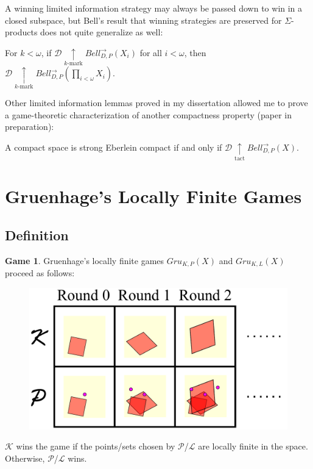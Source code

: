 \documentclass{beamer}
\theoremstyle{definition}
\newtheorem{game}[theorem]{Game}
\newcommand{\tactwin}{\underset{\text{tact}}{\uparrow}}
\newcommand{\kmarkwin}[1]{\underset{#1\text{-mark}}{\uparrow}}
\newcommand{\gruKPGame}[1]{Gru_{K,P}\left({#1}\right)}
\newcommand{\gruKLGame}[1]{Gru_{K,L}\left({#1}\right)}
\newcommand{\bellAbsConGame}[1]{Bell_{D,P}^{\to}\left({#1}\right)}
\newcommand{\<}{\langle}
\renewcommand{\>}{\rangle}
\newcommand{\pl}[1]{\mathscr{#1}}
\begin{document}
\begin{frame}\small
  A winning limited information strategy may always be passed down
  to win in a closed subspace, but Bell's result that winning strategies
  are preserved for $\Sigma$-products does not quite generalize as well:

  \begin{theorem}
    For $k<\omega$, if $\pl D\kmarkwin{k}\bellAbsConGame{X_i}$ for all $i<\omega$,
    then $\pl D\kmarkwin{k}\bellAbsConGame{\prod_{i<\omega} X_i}$.
  \end{theorem}

  \pause

  Other limited information lemmas proved in my dissertation allowed me
  to prove a game-theoretic characterization of another compactness property
  (paper in preparation):

  \begin{theorem}
    A compact space is strong Eberlein compact if and only if
    $\pl D\tactwin\bellAbsConGame{X}$.
  \end{theorem}
\end{frame}





\section{Gruenhage's Locally Finite Games}

\subsection{Definition}

\begin{frame}
  \small
  \begin{game}
  Gruenhage's locally finite games $\gruKPGame{X}$ and
  $\gruKLGame{X}$ proceed as follows:
    \begin{figure}
      \includegraphics[width=0.6\linewidth]{compactPointGame.pdf}
    \end{figure}

  $\pl K$ wins the game if the points/sets chosen by $\pl P$/$\pl L$ are
  locally finite in the space. Otherwise, $\pl P$/$\pl L$  wins.
  \end{game}
\end{frame}
\end{document}
